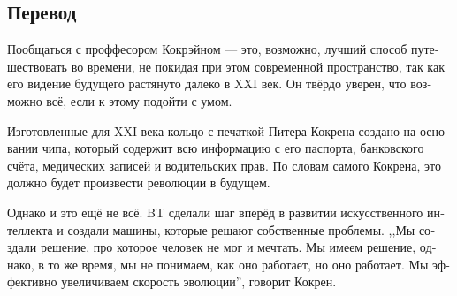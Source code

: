 \documentclass[a5paper,10pt,notitlepage,pdftex,headsepline]{scrartcl}
\begin{document}
  \subsection{Перевод}
    \begin{otherlanguage}{russian}
      Пообщаться с проффесором Кокрэйном --- это, возможно, лучший способ
      путешествовать во времени, не покидая при этом современной пространство,
      так как его видение будущего растянуто далеко в XXI век.
      Он твёрдо уверен, что возможно всё, если к этому подойти с умом.

      Изготовленные для XXI века кольцо с печаткой Питера Кокрена создано на
      основании чипа, который содержит всю информацию с его паспорта,
      банковского счёта, медических записей и водительских прав.
      По словам самого Кокрена, это должно будет произвести революции в
      будущем.

      Однако и это ещё не всё.
      BT сделали шаг вперёд в развитии искусственного интеллекта и создали
      машины, которые решают собственные проблемы.
      ,,Мы создали решение, про которое человек не мог и мечтать.
      Мы имеем решение, однако, в то же время, мы не понимаем, как оно
      работает, но оно работает.
      Мы эффективно увеличиваем скорость эволюции'', говорит Кокрен.
    \end{otherlanguage}
\end{document}
